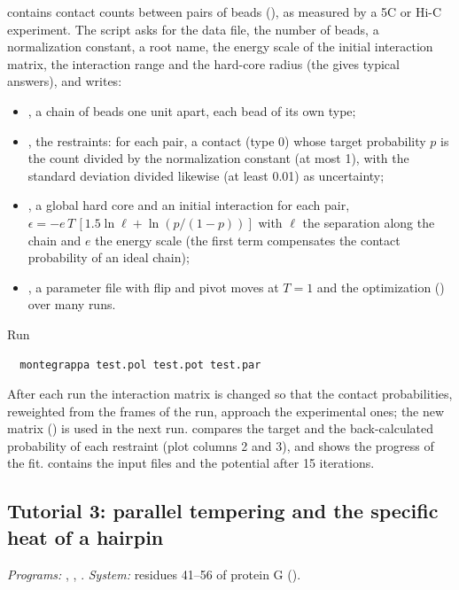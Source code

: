 \documentclass[11pt,a4paper]{article}
\begin{document}
 contains contact counts between pairs of beads
(), as measured by a 5C or Hi-C experiment.
The script  asks for the data file, the number of beads,
a normalization constant, a root name, the energy scale of the initial
interaction matrix, the interaction range and the hard-core radius (the
 gives typical answers), and writes:
\begin{itemize}
\item {}, a chain of beads one unit apart, each bead of its own type;
\item {}, the restraints: for each pair, a contact (type 0) whose
  target probability $p$ is the count divided by the normalization constant
  (at most 1), with the standard deviation divided likewise (at least 0.01)
  as uncertainty;
\item {}, a global hard core and an initial interaction for each
  pair, $\epsilon = -e\,T\,[1.5\ln\ell + \ln(p/(1-p))]$ with $\ell$ the
  separation along the chain and $e$ the energy scale (the first term
  compensates the contact probability of an ideal chain);
\item {}, a parameter file with flip and pivot moves at $T=1$ and
  the optimization () over many runs.
\end{itemize}
Run
\begin{Verbatim}
  montegrappa test.pol test.pot test.par
\end{Verbatim}
After each run the interaction matrix is changed so that the contact
probabilities, reweighted from the frames of the run, approach the
experimental ones; the new matrix () is used in the
next run.  compares the target and the
back-calculated probability of each restraint (plot columns 2 and 3), and
 shows the progress of the fit.  contains the
input files and the potential after 15 iterations.

\subsection{Tutorial 3: parallel tempering and the specific heat of a hairpin}
\emph{Programs:} , , .
\emph{System:} residues 41--56 of protein G ().
\end{document}

